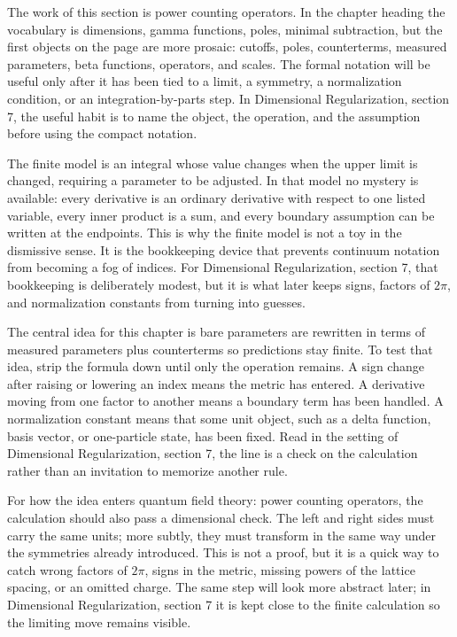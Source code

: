 The work of this section is power counting operators.  In the chapter heading the vocabulary is dimensions, gamma functions, poles, minimal subtraction, but the first objects on the page are more prosaic: cutoffs, poles, counterterms, measured parameters, beta functions, operators, and scales.  The formal notation will be useful only after it has been tied to a limit, a symmetry, a normalization condition, or an integration-by-parts step.  In Dimensional Regularization, section 7, the useful habit is to name the object, the operation, and the assumption before using the compact notation.

The finite model is an integral whose value changes when the upper limit is changed, requiring a parameter to be adjusted.  In that model no mystery is available: every derivative is an ordinary derivative with respect to one listed variable, every inner product is a sum, and every boundary assumption can be written at the endpoints.  This is why the finite model is not a toy in the dismissive sense.  It is the bookkeeping device that prevents continuum notation from becoming a fog of indices.  For Dimensional Regularization, section 7, that bookkeeping is deliberately modest, but it is what later keeps signs, factors of \(2\pi\), and normalization constants from turning into guesses.

The central idea for this chapter is bare parameters are rewritten in terms of measured parameters plus counterterms so predictions stay finite.  To test that idea, strip the formula down until only the operation remains.  A sign change after raising or lowering an index means the metric has entered.  A derivative moving from one factor to another means a boundary term has been handled.  A normalization constant means that some unit object, such as a delta function, basis vector, or one-particle state, has been fixed.  Read in the setting of Dimensional Regularization, section 7, the line is a check on the calculation rather than an invitation to memorize another rule.

For how the idea enters quantum field theory: power counting operators, the calculation should also pass a dimensional check.  The left and right sides must carry the same units; more subtly, they must transform in the same way under the symmetries already introduced.  This is not a proof, but it is a quick way to catch wrong factors of \(2\pi\), signs in the metric, missing powers of the lattice spacing, or an omitted charge.  The same step will look more abstract later; in Dimensional Regularization, section 7 it is kept close to the finite calculation so the limiting move remains visible.

